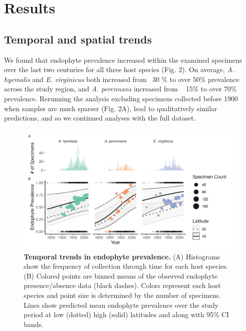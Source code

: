 \documentclass[11pt]{article}
\begin{document}
		
\section*{Results}

\subsection*{Temporal and spatial trends}

We found that endophyte prevalence increased within the examined specimens over the last two centuries for all three host species (Fig. 2). 
On average, \emph{A. hyemalis} and \emph{E. virginicus} both increased from ~30 \% to over 50\% prevalence across the study region, and \emph{A. perennans} increased from ~ 15\% to over 70\% prevalence.
Rerunning the analysis excluding specimens collected before 1900 when samples are much sparser (Fig. 2A), lead to qualitatively similar predictions, and so we continued analyses with the full dataset. 

\begin{figure}[H]
	\centering
	\includegraphics[width = \linewidth]{year_plot.png}
	\caption{\textbf{Temporal trends in endophyte prevalence.} (A) Histograms show the frequency of collection through time for each host species. (B) Colored points are binned means of the observed endophyte presence/absence data (black dashes). Colors represent each host species and point size is determined by the number of specimens. Lines show predicted mean endophyte prevalence over the study period at low (dotted) high (solid) latitudes and along with 95\% CI bands.}
\end{figure}
\end{document}
